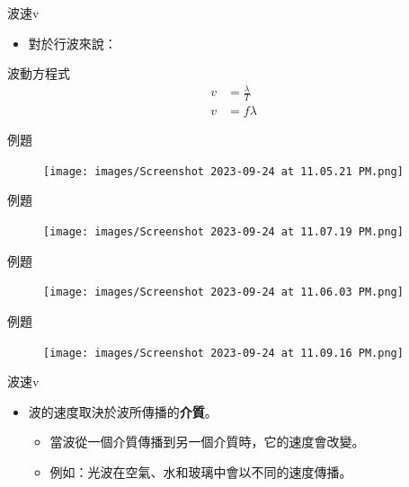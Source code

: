\documentclass[13pt]{beamer}
\begin{document}
\begin{frame}{波速v}
    \begin{itemize}
        \item 對於行波來說：
    \end{itemize}\bigskip
    
    \bigskip

    \begin{alertblock}{波動方程式}
        \begin{align*}
            v & =\frac{\lambda}{T} \\
            v & =f\lambda
        \end{align*}
    \end{alertblock}
\end{frame}

\begin{frame}{例題}
    \begin{figure}
        \centering
        \texttt{[image: images/Screenshot 2023-09-24 at 11.05.21 PM.png]}


    \end{figure}
\end{frame}

\begin{frame}{例題}
    \begin{figure}
        \centering
        \texttt{[image: images/Screenshot 2023-09-24 at 11.07.19 PM.png]}


    \end{figure}
\end{frame}

\begin{frame}{例題}
    \begin{figure}
        \centering
        \texttt{[image: images/Screenshot 2023-09-24 at 11.06.03 PM.png]}


    \end{figure}
\end{frame}
\begin{frame}{例題}
    \begin{figure}
        \centering
        \texttt{[image: images/Screenshot 2023-09-24 at 11.09.16 PM.png]}


    \end{figure}
\end{frame}

\begin{frame}{波速v}
    \begin{itemize}
        \item 波的速度取決於波所傳播的\textbf{介質}。
              \begin{itemize}
                  \item 當波從一個介質傳播到另一個介質時，它的速度會改變。
                  \item 例如：光波在空氣、水和玻璃中會以不同的速度傳播。
              \end{itemize}

    \end{itemize}
\end{frame}
\end{document}
